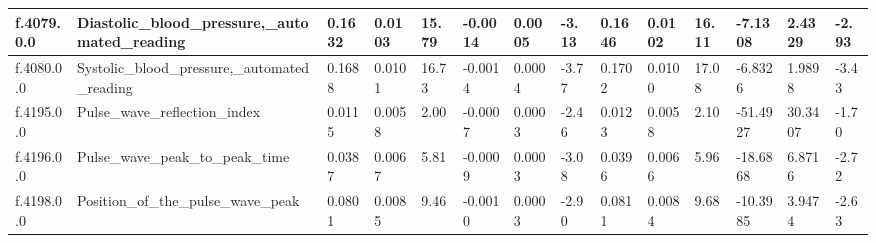 \begin{longtable}{llllllllllllll}
\multicolumn{1}{|l|}{f.4079.0.0} &
  \multicolumn{1}{l|}{Diastolic\_blood\_pressure,\_automated\_reading} &
  \multicolumn{1}{l|}{0.1632} &
  \multicolumn{1}{l|}{0.0103} &
  \multicolumn{1}{l|}{15.79} &
  \multicolumn{1}{l|}{-0.0014} &
  \multicolumn{1}{l|}{0.0005} &
  \multicolumn{1}{l|}{-3.13} &
  \multicolumn{1}{l|}{0.1646} &
  \multicolumn{1}{l|}{0.0102} &
  \multicolumn{1}{l|}{16.11} &
  \multicolumn{1}{l|}{-7.1308} &
  \multicolumn{1}{l|}{2.4329} &
  \multicolumn{1}{l|}{-2.93} \\ \hline
\multicolumn{1}{|l|}{f.4080.0.0} &
  \multicolumn{1}{l|}{Systolic\_blood\_pressure,\_automated\_reading} &
  \multicolumn{1}{l|}{0.1688} &
  \multicolumn{1}{l|}{0.0101} &
  \multicolumn{1}{l|}{16.73} &
  \multicolumn{1}{l|}{-0.0014} &
  \multicolumn{1}{l|}{0.0004} &
  \multicolumn{1}{l|}{-3.77} &
  \multicolumn{1}{l|}{0.1702} &
  \multicolumn{1}{l|}{0.0100} &
  \multicolumn{1}{l|}{17.08} &
  \multicolumn{1}{l|}{-6.8326} &
  \multicolumn{1}{l|}{1.9898} &
  \multicolumn{1}{l|}{-3.43} \\ \hline
\multicolumn{1}{|l|}{f.4195.0.0} &
  \multicolumn{1}{l|}{Pulse\_wave\_reflection\_index} &
  \multicolumn{1}{l|}{0.0115} &
  \multicolumn{1}{l|}{0.0058} &
  \multicolumn{1}{l|}{2.00} &
  \multicolumn{1}{l|}{-0.0007} &
  \multicolumn{1}{l|}{0.0003} &
  \multicolumn{1}{l|}{-2.46} &
  \multicolumn{1}{l|}{0.0123} &
  \multicolumn{1}{l|}{0.0058} &
  \multicolumn{1}{l|}{2.10} &
  \multicolumn{1}{l|}{-51.4927} &
  \multicolumn{1}{l|}{30.3407} &
  \multicolumn{1}{l|}{-1.70} \\ \hline
\multicolumn{1}{|l|}{f.4196.0.0} &
  \multicolumn{1}{l|}{Pulse\_wave\_peak\_to\_peak\_time} &
  \multicolumn{1}{l|}{0.0387} &
  \multicolumn{1}{l|}{0.0067} &
  \multicolumn{1}{l|}{5.81} &
  \multicolumn{1}{l|}{-0.0009} &
  \multicolumn{1}{l|}{0.0003} &
  \multicolumn{1}{l|}{-3.08} &
  \multicolumn{1}{l|}{0.0396} &
  \multicolumn{1}{l|}{0.0066} &
  \multicolumn{1}{l|}{5.96} &
  \multicolumn{1}{l|}{-18.6868} &
  \multicolumn{1}{l|}{6.8716} &
  \multicolumn{1}{l|}{-2.72} \\ \hline
\multicolumn{1}{|l|}{f.4198.0.0} &
  \multicolumn{1}{l|}{Position\_of\_the\_pulse\_wave\_peak} &
  \multicolumn{1}{l|}{0.0801} &
  \multicolumn{1}{l|}{0.0085} &
  \multicolumn{1}{l|}{9.46} &
  \multicolumn{1}{l|}{-0.0010} &
  \multicolumn{1}{l|}{0.0003} &
  \multicolumn{1}{l|}{-2.90} &
  \multicolumn{1}{l|}{0.0811} &
  \multicolumn{1}{l|}{0.0084} &
  \multicolumn{1}{l|}{9.68} &
  \multicolumn{1}{l|}{-10.3985} &
  \multicolumn{1}{l|}{3.9474} &
  \multicolumn{1}{l|}{-2.63} \\ \hline

\end{longtable}
